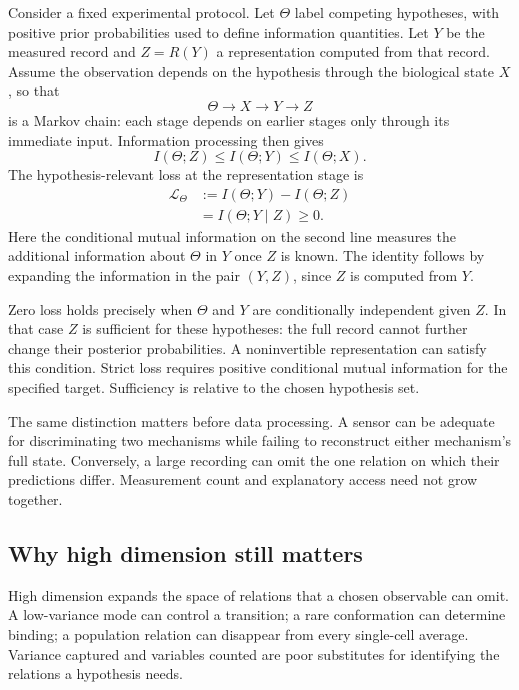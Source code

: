 \documentclass[10pt,twocolumn]{article}
\begin{document}
Consider a fixed experimental protocol. Let \(\Theta\) label competing hypotheses, with positive prior probabilities used to define information quantities. Let \(Y\) be the measured record and \(Z=R(Y)\) a representation computed from that record. Assume the observation depends on the hypothesis through the biological state \(X\), so that
\[
\Theta\longrightarrow X\longrightarrow Y\longrightarrow Z
\]
is a Markov chain: each stage depends on earlier stages only through its immediate input. Information processing then gives
\begin{equation}
I(\Theta;Z)\leq I(\Theta;Y)\leq I(\Theta;X).
\label{eq:dpi}
\end{equation}
The hypothesis-relevant loss at the representation stage is
\begin{align}
\mathcal L_\Theta
&:=I(\Theta;Y)-I(\Theta;Z)\nonumber\\
&=I(\Theta;Y\mid Z)\geq 0.
\label{eq:loss}
\end{align}
Here the conditional mutual information on the second line measures the additional information about \(\Theta\) in \(Y\) once \(Z\) is known. The identity follows by expanding the information in the pair \((Y,Z)\), since \(Z\) is computed from \(Y\).

Zero loss holds precisely when \(\Theta\) and \(Y\) are conditionally independent given \(Z\). In that case \(Z\) is sufficient for these hypotheses: the full record cannot further change their posterior probabilities. A noninvertible representation can satisfy this condition. Strict loss requires positive conditional mutual information for the specified target. Sufficiency is relative to the chosen hypothesis set.

The same distinction matters before data processing. A sensor can be adequate for discriminating two mechanisms while failing to reconstruct either mechanism's full state. Conversely, a large recording can omit the one relation on which their predictions differ. Measurement count and explanatory access need not grow together.

\subsection{Why high dimension still matters}

High dimension expands the space of relations that a chosen observable can omit. A low-variance mode can control a transition; a rare conformation can determine binding; a population relation can disappear from every single-cell average. Variance captured and variables counted are poor substitutes for identifying the relations a hypothesis needs.
\end{document}
